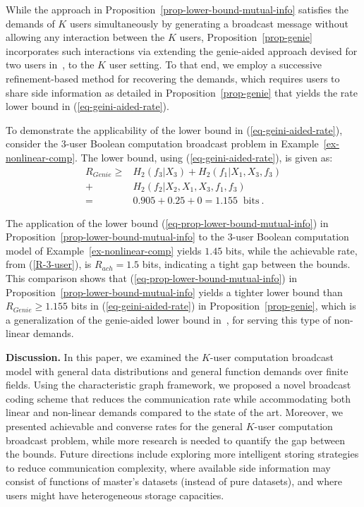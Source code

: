 \documentclass[conference, letterpaper]{IEEEtran} %
\begin{document}
While the approach in Proposition~\ref{prop-lower-bound-mutual-info} satisfies the demands of $K$ users simultaneously by generating a broadcast message without allowing any interaction between the $K$ users, 
Proposition~\ref{prop-genie} incorporates such interactions via extending the genie-aided approach devised for two users in~\cite{jafar2006capacity}, to the $K$ user setting. 
To that end, we employ a successive refinement-based method for recovering the demands, which requires users to share side information as detailed in Proposition~\ref{prop-genie} that yields the rate lower bound in (\ref{eq-geini-aided-rate}).

%
%
To demonstrate the applicability of the lower bound in (\ref{eq-geini-aided-rate}), consider the $3$-user Boolean computation broadcast problem in Example~\ref{ex-nonlinear-comp}. The lower bound, using (\ref{eq-geini-aided-rate}), is given as:
 \begin{align}
 \label{eq-low-bound-gein-ex-3-user-nonlin}
 R_{Genie}\geq &H_2(f_3|X_3)+H_2(f_1|X_1, X_3, f_3) \nonumber\\  
+& H_2(f_2|X_2,X_1,X_3, f_1,f_3) \nonumber\\
=&0.905+0.25+0=1.155\: \text{ bits}\ .
 \end{align}

The application of the lower bound (\ref{eq-prop-lower-bound-mutual-info}) in Proposition~\ref{prop-lower-bound-mutual-info} to the $3$-user Boolean computation model of Example~\ref{ex-nonlinear-comp} yields $1.45$ bits, 
while the achievable rate, from (\ref{R-3-user}), is $R_{ach}=1.5$ bits, indicating a tight gap between the bounds. 
This comparison shows that (\ref{eq-prop-lower-bound-mutual-info}) in Proposition~\ref{prop-lower-bound-mutual-info} yields a tighter lower bound than $R_{Genie}\geq 1.155$ bits in (\ref{eq-geini-aided-rate}) in Proposition~\ref{prop-genie}, which is a generalization of the genie-aided lower bound in~\cite{jafar2006capacity}, for serving this type of non-linear demands.




 


{\bf Discussion.} 
In this paper, we examined the $K$-user computation broadcast model with general data distributions and general function demands over finite fields.
Using the characteristic graph framework, we proposed a novel broadcast coding scheme that reduces the communication rate while accommodating both linear and non-linear demands compared to the state of the art. Moreover, we presented achievable and converse rates for the general $K$-user computation broadcast problem, while more research is needed to quantify the gap between the bounds. 
Future directions include exploring more intelligent storing strategies to reduce communication complexity, where available side information may consist of functions of master's datasets (instead of pure datasets), and where users might have heterogeneous storage capacities.
\end{document}
